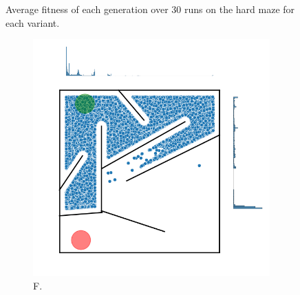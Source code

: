 \begin{figure}[H]
    \begin{center}
        
    \end{center}
    \caption{Average fitness of each generation over 30 runs on the hard maze for each variant.}
    \label{hard_fitness}
\end{figure}

\begin{figure}[H]
    \begin{mdframed}
        \begin{subfigure}[t]{0.45\textwidth}
            \includegraphics[scale=0.4]{resources/mazes/pure_fitness_hard_all.png}
            \caption{F.}
        \end{subfigure}
        \begin{subfigure}[t]{0.5\textwidth}

\end{subfigure}
\end{mdframed}
\end{figure}

